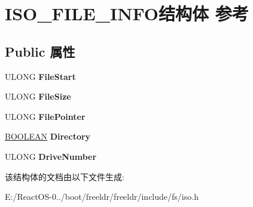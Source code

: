 \hypertarget{struct_i_s_o___f_i_l_e___i_n_f_o}{}\section{I\+S\+O\+\_\+\+F\+I\+L\+E\+\_\+\+I\+N\+F\+O结构体 参考}
\label{struct_i_s_o___f_i_l_e___i_n_f_o}
\subsection*{Public 属性}
\begin{DoxyCompactItemize}
\item 
\mbox{\label{struct_i_s_o___f_i_l_e___i_n_f_o_a34d37d43a6be430e70129125b5f13678}} 
U\+L\+O\+NG {\bfseries File\+Start}
\item 
\mbox{\label{struct_i_s_o___f_i_l_e___i_n_f_o_a1fbfd18e9c452cbc9056c4addc288a56}} 
U\+L\+O\+NG {\bfseries File\+Size}
\item 
\mbox{\label{struct_i_s_o___f_i_l_e___i_n_f_o_ade69f6d58688736d6320651bc83e4658}} 
U\+L\+O\+NG {\bfseries File\+Pointer}
\item 
\mbox{\label{struct_i_s_o___f_i_l_e___i_n_f_o_af90bf4c195f4d2599893e295dc963adf}} 
\hyperlink{_processor_bind_8h_a112e3146cb38b6ee95e64d85842e380a}{B\+O\+O\+L\+E\+AN} {\bfseries Directory}
\item 
\mbox{\label{struct_i_s_o___f_i_l_e___i_n_f_o_a956796bed2fbe5234d6b57eb16e520d0}} 
U\+L\+O\+NG {\bfseries Drive\+Number}
\end{DoxyCompactItemize}


该结构体的文档由以下文件生成\+:\begin{DoxyCompactItemize}
\item 
E\+:/\+React\+O\+S-\/0../boot/freeldr/freeldr/include/fs/iso.\+h\end{DoxyCompactItemize}
